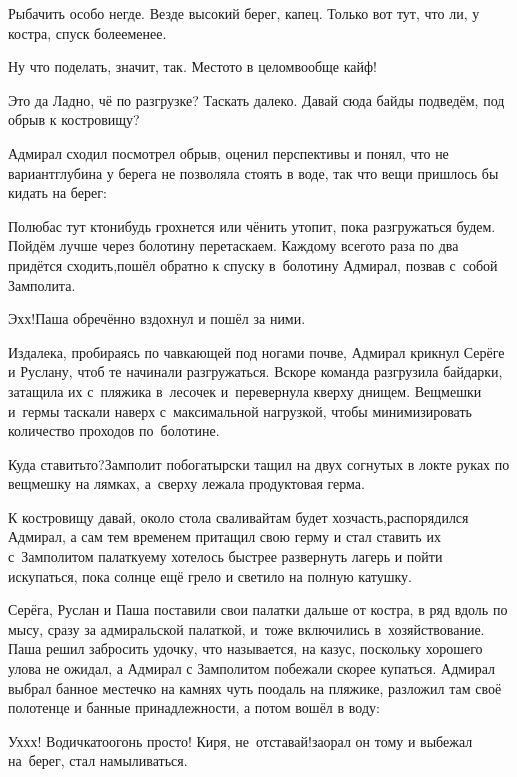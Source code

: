 
\diagdash Рыбачить особо негде. Везде высокий берег, капец. Только вот тут, что ли, у костра, спуск более\sdash менее.

\diagdash Ну что поделать, значит, так. Место\sdash то в целом\mdash вообще кайф!

\diagdash Это да\myldots{} Ладно, чё по разгрузке? Таскать далеко. Давай сюда байды подведём, под обрыв к костровищу? 

Адмирал сходил посмотрел обрыв, оценил перспективы и понял, что не вариант\mdash глубина у берега не позволяла стоять в воде, так что вещи пришлось бы кидать на берег:

\diagdash Полюбас тут кто\sdash нибудь грохнется или чё\sdash нить утопит, пока разгружаться будем. Пойдём лучше через болотину перетаскаем. Каждому всего\sdash то раза по два придётся сходить,\mdash пошёл обратно к спуску в~болотину Адмирал, позвав с~собой Замполита.

\diagdash Эх\sdash х!\mdash Паша обречённо вздохнул и пошёл за ними.

Издалека, пробираясь по чавкающей под ногами почве, Адмирал крикнул Серёге и Руслану, чтоб те начинали разгружаться. Вскоре команда разгрузила байдарки, затащила их с~пляжика в~лесочек и~перевернула кверху днищем. Вещмешки и~гермы таскали наверх с~максимальной нагрузкой, чтобы минимизировать количество проходов по~болотине.

\diagdash Куда ставить\sdash то?\mdash Замполит по\sdash богатырски тащил на двух согнутых в локте руках по вещмешку на лямках, а~сверху лежала продуктовая герма.

\diagdash К костровищу давай, около стола сваливай\mdash там будет хозчасть,\mdash распорядился Адмирал, а сам тем временем притащил свою герму и стал ставить их с~Замполитом палатку\mdash ему хотелось быстрее развернуть лагерь и пойти искупаться, пока солнце ещё грело и светило на полную катушку.

Серёга, Руслан и Паша поставили свои палатки дальше от костра, в ряд вдоль по мысу, сразу за адмиральской палаткой, и~тоже включились в~хозяйствование. Паша решил забросить удочку, что называется, на казус, поскольку хорошего улова не ожидал, а Адмирал с Замполитом побежали скорее купаться. Адмирал выбрал банное местечко на камнях чуть поодаль на пляжике, разложил там своё полотенце и банные принадлежности, а потом вошёл в воду: 

\diagdash Ух\sdash х\sdash х! Водичка\sdash то\mdash огонь просто! Киря, не~отставай!\mdash заорал он тому и выбежал на~берег, стал намыливаться.

